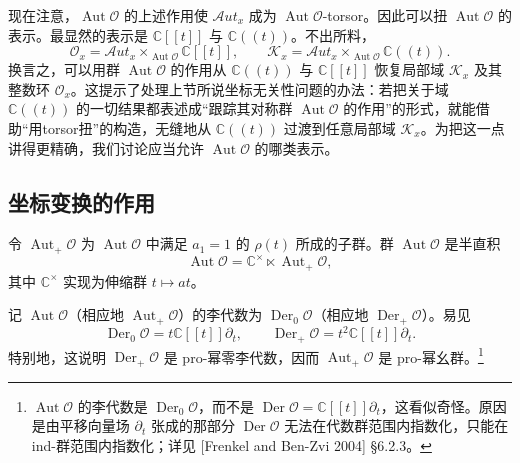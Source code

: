 
现在注意，$\operatorname{Aut}\mathcal{O}$ 的上述作用使 $\mathcal{A}ut_x$ 成为 $\operatorname{Aut}\mathcal{O}$-torsor。因此可以扭 $\operatorname{Aut}\mathcal{O}$ 的表示。最显然的表示是 $\mathbb{C}[[t]]$ 与 $\mathbb{C}((t))$。不出所料，
\begin{equation}
    \mathcal{O}_x=\mathcal{A}ut_x\times_{\operatorname{Aut}\mathcal{O}}\mathbb{C}[[t]],
    \qquad
    \mathcal{K}_x=\mathcal{A}ut_x\times_{\operatorname{Aut}\mathcal{O}}\mathbb{C}((t)).
    \tag{3.5-5}
\end{equation}
换言之，可以用群 $\operatorname{Aut}\mathcal{O}$ 的作用从 $\mathbb{C}((t))$ 与 $\mathbb{C}[[t]]$ 恢复局部域 $\mathcal{K}_x$ 及其整数环 $\mathcal{O}_x$。这提示了处理上节所说坐标无关性问题的办法：若把关于域 $\mathbb{C}((t))$ 的一切结果都表述成“跟踪其对称群 $\operatorname{Aut}\mathcal{O}$ 的作用”的形式，就能借助“用torsor扭”的构造，无缝地从 $\mathbb{C}((t))$ 过渡到任意局部域 $\mathcal{K}_x$。为把这一点讲得更精确，我们讨论应当允许 $\operatorname{Aut}\mathcal{O}$ 的哪类表示。

\subsection{坐标变换的作用}

令 $\operatorname{Aut}_+\mathcal{O}$ 为 $\operatorname{Aut}\mathcal{O}$ 中满足 $a_1=1$ 的 $\rho(t)$ 所成的子群。群 $\operatorname{Aut}\mathcal{O}$ 是半直积
\[
    \operatorname{Aut}\mathcal{O}=\mathbb{C}^\times\ltimes\operatorname{Aut}_+\mathcal{O},
\]
其中 $\mathbb{C}^\times$ 实现为伸缩群 $t\mapsto at$。

记 $\operatorname{Aut}\mathcal{O}$（相应地 $\operatorname{Aut}_+\mathcal{O}$）的李代数为 $\operatorname{Der}_0\mathcal{O}$（相应地 $\operatorname{Der}_+\mathcal{O}$）。易见
\[
    \operatorname{Der}_0\mathcal{O}=t\mathbb{C}[[t]]\partial_t,\qquad
    \operatorname{Der}_+\mathcal{O}=t^2\mathbb{C}[[t]]\partial_t .
\]
特别地，这说明 $\operatorname{Der}_+\mathcal{O}$ 是 pro-幂零李代数，因而 $\operatorname{Aut}_+\mathcal{O}$ 是 pro-幂幺群。\footnote{$\operatorname{Aut}\mathcal{O}$ 的李代数是 $\operatorname{Der}_0\mathcal{O}$，而不是 $\operatorname{Der}\mathcal{O}=\mathbb{C}[[t]]\partial_t$，这看似奇怪。原因是由平移向量场 $\partial_t$ 张成的那部分 $\operatorname{Der}\mathcal{O}$ 无法在代数群范围内指数化，只能在 ind-群范围内指数化；详见 [Frenkel and Ben-Zvi 2004] §6.2.3。}

